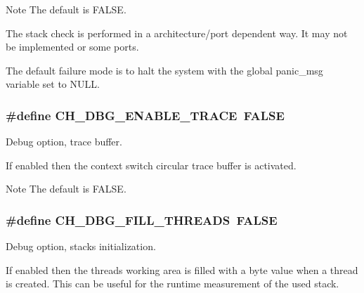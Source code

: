 \begin{DoxyNote}{Note}
The default is {\ttfamily F\+A\+L\+S\+E}. 

The stack check is performed in a architecture/port dependent way. It may not be implemented or some ports. 

The default failure mode is to halt the system with the global {\ttfamily panic\+\_\+msg} variable set to {\ttfamily N\+U\+L\+L}. 
\end{DoxyNote}
\hypertarget{group__config_ga8bc4cfd861131aeb3c880347d0068229}{
\subsubsection[{C\+H\+\_\+\+D\+B\+G\+\_\+\+E\+N\+A\+B\+L\+E\+\_\+\+T\+R\+A\+C\+E}]{\setlength{\rightskip}{0pt plus 5cm}\#define C\+H\+\_\+\+D\+B\+G\+\_\+\+E\+N\+A\+B\+L\+E\+\_\+\+T\+R\+A\+C\+E~F\+A\+L\+S\+E}}\label{group__config_ga8bc4cfd861131aeb3c880347d0068229}


Debug option, trace buffer. 

If enabled then the context switch circular trace buffer is activated.

\begin{DoxyNote}{Note}
The default is {\ttfamily F\+A\+L\+S\+E}. 
\end{DoxyNote}
\hypertarget{group__config_ga6a859dd249adfb66b9bbf809061ea06c}{
\subsubsection[{C\+H\+\_\+\+D\+B\+G\+\_\+\+F\+I\+L\+L\+\_\+\+T\+H\+R\+E\+A\+D\+S}]{\setlength{\rightskip}{0pt plus 5cm}\#define C\+H\+\_\+\+D\+B\+G\+\_\+\+F\+I\+L\+L\+\_\+\+T\+H\+R\+E\+A\+D\+S~F\+A\+L\+S\+E}}\label{group__config_ga6a859dd249adfb66b9bbf809061ea06c}


Debug option, stacks initialization. 

If enabled then the threads working area is filled with a byte value when a thread is created. This can be useful for the runtime measurement of the used stack.

